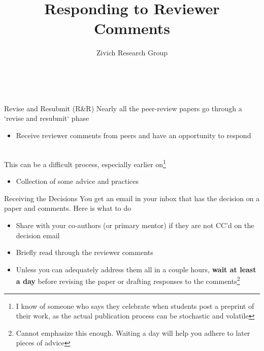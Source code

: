 \documentclass[aspectratio=169]{beamer}
\title[Revise \& Resubmit]{Responding to Reviewer Comments}
\author[Paul Zivich]{Zivich Research Group}
\date{~}
\begin{document}
\maketitle

\begin{frame}{Revise and Resubmit (R\&R)}
	Nearly all the peer-review papers go through a `revise and resubmit` phase
	\begin{itemize}
		\item Receive reviewer comments from peers and have an opportunity to respond
	\end{itemize}
	~\\
	This can be a difficult process, especially earlier on\footnote[frame]{I know of someone who says they celebrate when students post a preprint of their work, as the actual publication process can be stochastic and volatile}
	\begin{itemize}
		\item Collection of some advice and practices
	\end{itemize}
\end{frame}

\begin{frame}{Receiving the Decisions}
	You get an email in your inbox that has the decision on a paper and comments. Here is what to do
	\begin{itemize}
		\item Share with your co-authors (or primary mentor) if they are not CC'd on the decision email
		\item Briefly read through the reviewer comments
		\item Unless you can adequately address them all in a couple hours, \textbf{wait at least a day} before revising the paper or drafting responses to the comments\footnote[frame]{Cannot emphasize this enough. Waiting a day will help you adhere to later pieces of advice}
	\end{itemize}
\end{frame}
\end{document}
